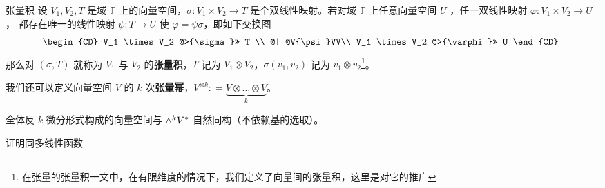 
\begin{issues}
\issueDraft
\end{issues}


\begin{definition}{张量积}\label{def_vecTsr_1}
设 $V_1, V_2,T$ 是域 $\mathbb F$ 上的向量空间，$\sigma: V_1 \times V_2 \rightarrow T$ 是个双线性映射。若对域 $\mathbb F$ 上任意向量空间 $U$ ，任一双线性映射 $\varphi:V_1\times V_2\rightarrow U$， 都存在唯一的线性映射 $\psi:T\rightarrow U$ 使 $\varphi=\psi\sigma$，即如下交换图
\begin{equation}
\begin{CD}
V_1 \times V_2 @>{\sigma}>> T \\
@| @V{\psi}VV\\
V_1 \times V_2 @>{\varphi}>> U
\end{CD}~
\end{equation}
那么对 $(\sigma, T)$ 就称为 $V_1$ 与 $V_2$ 的\textbf{张量积}，$T$ 记为 $V_1 \otimes V_2$，$\sigma(v_1, v_2)$ 记为 $v_1 \otimes v_2$\footnote{在张量的张量积一文中，在有限维度的情况下，我们定义了向量间的张量积，这里是对它的推广}。

我们还可以定义向量空间 $V$ 的 $k$ 次\textbf{张量幂}，$V^{\otimes k}: = \underbrace{V \otimes \dots \otimes V}_k$。
\end{definition}


\begin{theorem}{}
全体反 $k$-微分形式构成的向量空间与 ${\large \wedge}^k V^*$ 自然同构（不依赖基的选取）。
\end{theorem}
证明同多线性函数